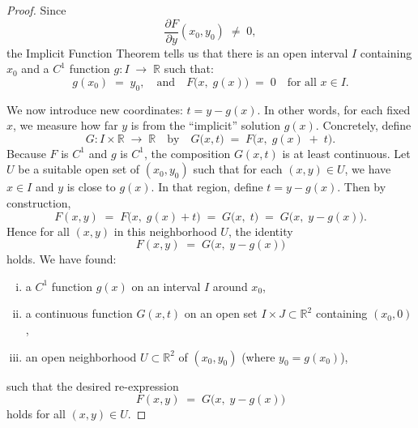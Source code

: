 \documentclass[11pt]{article}
\begin{document}
\begin{exercise}{2}
    \begin{proof} Since 
\[
\frac{\partial F}{\partial y}(x_0,y_0)\;\neq\;0,
\]
the Implicit Function Theorem tells us that there is an open interval $I$ containing $x_0$ and a $C^1$ function
\(
g: I \;\to\; \mathbb{R}
\)
such that:
\[
g(x_0) \;=\; y_0,
\quad\text{and}\quad
F\bigl(x,\;g(x)\bigr) \;=\; 0 \quad \text{for all }x \in I.
\]

We now introduce new coordinates:
\(
t = y - g(x).
\)
In other words, for each fixed $x$, we measure how far $y$ is from the ``implicit'' solution $g(x)$.  Concretely, define
\[
G\colon I \times \mathbb{R} \;\to\; \mathbb{R}
\quad\text{by}\quad
G\bigl(x,t\bigr) 
\;=\; 
F\bigl(x,\;g(x) \;+\; t\bigr).
\]
Because $F$ is $C^1$ and $g$ is $C^1$, the composition $G(x,t)$ is at least continuous. Let $U$ be a suitable open set of $(x_0,y_0)$ such that for each $(x,y)\in U$, we have $x\in I$ and $y$ is close to $g(x)$.  In that region, define
\(
t = y - g(x).
\)
Then by construction,
\[
F(x,y) 
\;=\; 
F\bigl(x,\;g(x) + t\bigr) 
\;=\; 
G\bigl(x,\;t\bigr) 
\;=\;
G\bigl(x,\;y - g(x)\bigr).
\]
Hence for all $(x,y)$ in this neighborhood $U$, the identity
\[
F(x,y) 
\;=\; 
G\bigl(x,\;y - g(x)\bigr)
\]
holds.  
We have found:
\begin{enumerate} [(i)]
\item a $C^1$ function $g(x)$ on an interval $I$ around $x_0$,
\item a continuous function $G(x,t)$ on an open set $I\times J\subset\mathbb{R}^2$ containing $(x_0,0)$,
\item an open neighborhood $U\subset \mathbb{R}^2$ of $(x_0,y_0)$ (where $y_0=g(x_0)$),
\end{enumerate}
such that the desired re-expression
\[
F(x,y) 
\;=\; 
G\bigl(x,\;y - g(x)\bigr)
\]
holds for all $(x,y)\in U$. 
\end{proof}
\end{exercise}
\end{document}
